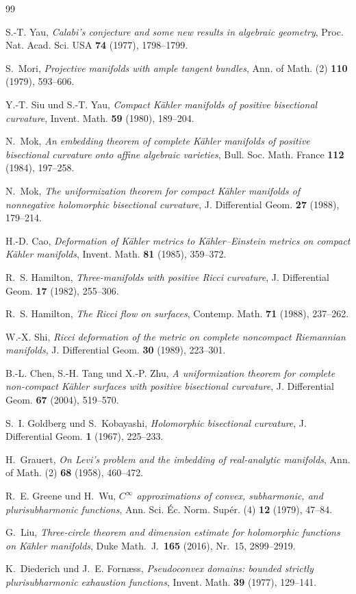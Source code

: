 \documentclass[12pt,a4paper]{amsart}
\theoremstyle{definition}
\theoremstyle{remark}
\begin{document}
\begin{thebibliography}{99}

S.-T. Yau,
\textit{Calabi's conjecture and some new results in algebraic geometry},
Proc. Nat. Acad. Sci. USA \textbf{74} (1977), 1798--1799.

S.~Mori,
\textit{Projective manifolds with ample tangent bundles},
Ann. of Math. (2) \textbf{110} (1979), 593--606.

Y.-T. Siu und S.-T. Yau,
\textit{Compact Kähler manifolds of positive bisectional curvature},
Invent. Math. \textbf{59} (1980), 189--204.

N.~Mok,
\textit{An embedding theorem of complete Kähler manifolds of positive bisectional curvature onto affine algebraic varieties},
Bull. Soc. Math. France \textbf{112} (1984), 197--258.

N.~Mok,
\textit{The uniformization theorem for compact Kähler manifolds of nonneg\-ative holomorphic bisectional curvature},
J. Differential Geom. \textbf{27} (1988), 179--214.

H.-D. Cao,
\textit{Deformation of Kähler metrics to Kähler--Einstein metrics on compact
Kähler manifolds},
Invent. Math. \textbf{81} (1985), 359--372.

R.~S. Hamilton,
\textit{Three-manifolds with positive Ricci curvature},
J. Differential Geom. \textbf{17} (1982), 255--306.

R.~S. Hamilton,
\textit{The Ricci flow on surfaces},
Contemp. Math. \textbf{71} (1988), 237--262.

W.-X. Shi,
\textit{Ricci deformation of the metric on complete noncompact Riemannian
manifolds},
J. Differential Geom. \textbf{30} (1989), 223--301.

B.-L. Chen, S.-H. Tang und X.-P. Zhu,
\textit{A uniformization theorem for complete non-compact Kähler surfaces
with positive bisectional curvature},
J. Differential Geom. \textbf{67} (2004), 519--570.

S.~I. Goldberg und S.~Kobayashi,
\textit{Holomorphic bisectional curvature},
J. Differential Geom. \textbf{1} (1967), 225--233.

H.~Grauert,
\textit{On Levi's problem and the imbedding of real-analytic manifolds},
Ann. of Math. (2) \textbf{68} (1958), 460--472.

R.~E. Greene und H.~Wu,
\textit{$C^\infty$ approximations of convex, subharmonic, and plurisubharmonic
functions},
Ann. Sci. Éc. Norm. Supér. (4) \textbf{12} (1979), 47--84.

G.~Liu,
\textit{Three-circle theorem and dimension estimate for holomorphic functions on K\"ahler manifolds},
Duke Math.\ J.\ \textbf{165} (2016), Nr.~15, 2899--2919.

K.~Diederich und J.~E. Fornæss,
\textit{Pseudoconvex domains: bounded strictly plurisubharmonic exhaustion
functions},
Invent. Math. \textbf{39} (1977), 129--141.

\end{thebibliography}
\end{document}

